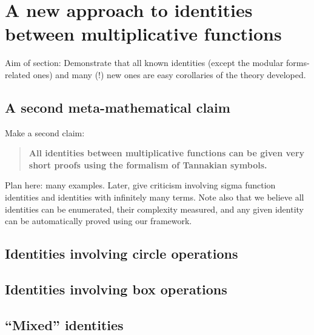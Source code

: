 \documentclass[a4paper]{article}
\begin{document}




\section{A new approach to identities between multiplicative functions}

Aim of section: Demonstrate that all known identities (except the modular forms-related ones) and many (!) new ones are easy corollaries of the theory developed. 


\subsection{A second meta-mathematical claim}

Make a second claim:
\begin{quote}
\textbf{All identities between multiplicative functions can be given very short proofs using the formalism of Tannakian symbols.}
\end{quote}

Plan here: many examples. Later, give criticism involving sigma function identities and identities with infinitely many terms. Note also that we believe all identities can be enumerated, their complexity measured, and any given identity can be automatically proved using our framework.



\subsection{Identities involving circle operations}


\subsection{Identities involving box operations}




\subsection{``Mixed'' identities}
\end{document}
